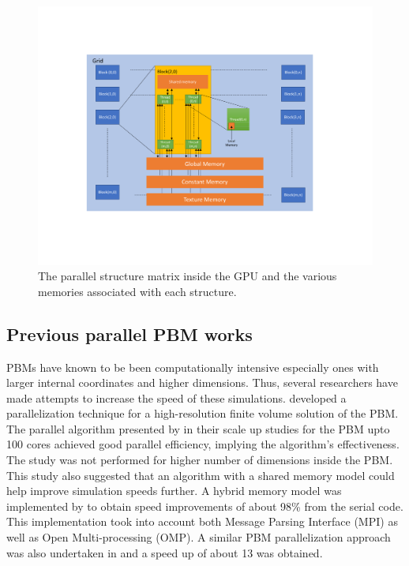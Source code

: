 \documentclass[preprint,10pt,authoryear,review]{elsarticle}
\begin{document}
\begin{linenumbers}
\begin{figure}
\centering
\includegraphics[scale=0.6]{bkg_gpu_arch.pdf}
\caption{The parallel structure matrix inside the GPU and the various memories associated 
with each structure.}
\label{fig:bkg_gpu_arch}
\end{figure}


\subsection{Previous parallel PBM works}
PBMs have known to be been computationally intensive especially ones with larger internal 
coordinates and higher dimensions. Thus, several researchers have made attempts to increase 
the speed of these simulations. \cite{Gunawan2008} developed a parallelization technique 
for a high-resolution finite volume solution of the PBM. The parallel algorithm presented by 
\cite{Gunawan2008} in their scale up studies for the PBM upto 100 cores achieved good 
parallel efficiency, implying the algorithm's effectiveness. The study was not performed for 
higher number of dimensions inside the PBM. This study also suggested that an algorithm 
with a shared memory model could help improve simulation speeds further. A hybrid memory model 
was implemented by \cite{Bettencourt2017} to obtain speed improvements of about 98\% from the 
serial code. This implementation took into account both Message Parsing Interface (MPI) as well 
as Open Multi-processing (OMP). A similar PBM parallelization approach was also undertaken in 
\citep{Sampat2018} and a speed up of about 13 was obtained. 


\end{linenumbers}
\end{document}
